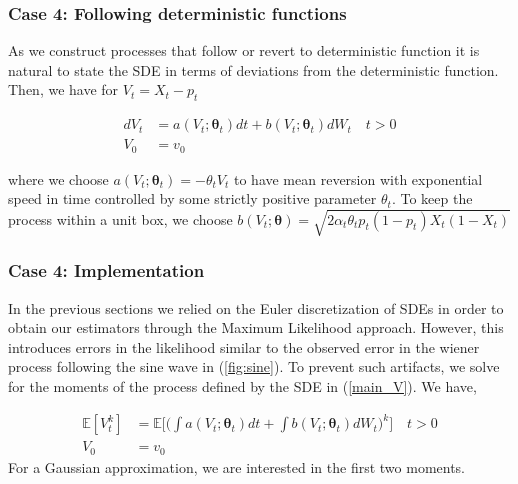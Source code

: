 \documentclass[aspectratio=169]{beamer}\usepackage[utf8]{inputenc}
\newcommand{\E}{\mathbb{E}}
\begin{document}
\begin{frame}\frametitle{ Case 4: Following deterministic functions }
As we construct processes that follow or revert to deterministic function it is natural to state the SDE in terms of deviations from the deterministic function. Then, we have for $V_t= X_t - p_t$

\begin{equation}
\begin{split}
dV_t &= a(V_t; \bm{\theta}_t) dt + b (V_t; \bm{\theta}_t ) dW_t \quad t > 0 \\
V_0 & = v_0
\end{split}\label{main_V}
\end{equation}

where we choose $ a(V_t; \bm{\theta}_t) = - \theta_t V_t$ to have mean reversion with exponential speed in time controlled by some strictly positive parameter $\theta_t$. To keep the process within a unit box, we choose $ b (V_t; \bm{\theta} )= \sqrt{ 2 \alpha_t \theta_t p_t (1-p_t)X_t (1-X_t)   }$

\end{frame}


\begin{frame}\frametitle{ Case 4: Implementation }
In the previous sections we relied on the Euler discretization of SDEs in order to obtain our estimators through the Maximum Likelihood approach. However, this introduces errors in the likelihood similar to the observed error in the wiener process following the sine wave in (\ref{fig:sine}). To prevent such artifacts, we solve for the moments of the process defined by the SDE in (\ref{main_V}). We have,

\begin{equation}
\begin{split}
\E [V_t^k] &=  \E \Big[ \Big( \int a(V_t; \bm{\theta}_t) dt + \int b (V_t; \bm{\theta}_t ) dW_t \Big)^k \Big] \quad t > 0 \\
V_0 & = v_0
\end{split}\label{main_V_expectations}
\end{equation}
For a Gaussian approximation, we are interested in the first two moments.

\end{frame}
\end{document}
